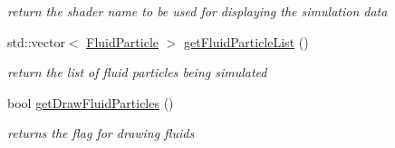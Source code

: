 \begin{DoxyCompactItemize}
\begin{DoxyCompactList}\small\item\em return the shader name to be used for displaying the simulation data \item\end{DoxyCompactList}\item 
std::vector$<$ \hyperlink{class_fluid_particle}{FluidParticle} $>$ \hyperlink{class_s_p_h_solver_ad389df7449294b5a8de1fc163acbf29b}{getFluidParticleList} ()
\begin{DoxyCompactList}\small\item\em return the list of fluid particles being simulated \item\end{DoxyCompactList}\item 
bool \hyperlink{class_s_p_h_solver_a4a224b16ea8c301048fb88cdbd0ac505}{getDrawFluidParticles} ()
\begin{DoxyCompactList}\small\item\em returns the flag for drawing fluids \item\end{DoxyCompactList}\end{DoxyCompactItemize}
